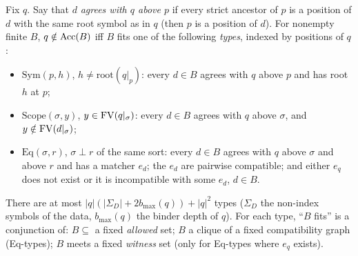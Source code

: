 \begin{lemma}\label{lem:many:types}
Fix $q$. Say that $d$ \emph{agrees with $q$ above $p$} if every strict ancestor of $p$ is a position of $d$ with the same
root symbol as in $q$ (then $p$ is a position of $d$). For nonempty finite $B$, $q\notin\mathrm{Acc}(B)$ iff $B$ fits one of the
following \emph{types}, indexed by positions of $q$:
\begin{itemize}
\item $\mathrm{Sym}(p,h)$, $h\neq\mathrm{root}(q|_p)$: every $d\in B$ agrees with $q$ above $p$ and has root $h$ at $p$;
\item $\mathrm{Scope}(\sigma,y)$, $y\in\mathrm{FV}(q|_\sigma)$: every $d\in B$ agrees with $q$ above $\sigma$, and
  $y\notin\mathrm{FV}(d|_\sigma)$;
\item $\mathrm{Eq}(\sigma,r)$, $\sigma\perp r$ of the same sort: every $d\in B$ agrees with $q$ above $\sigma$ and above $r$
  and has a matcher $e_d$; the $e_d$ are pairwise compatible; and either $e_q$ does not exist or it is incompatible with
  some $e_d$, $d\in B$.
\end{itemize}
There are at most $|q|(|\Sigma_D|+2b_{\max}(q))+|q|^2$ types ($\Sigma_D$ the non-index symbols of the data, $b_{\max}(q)$ the
binder depth of $q$). For each type, ``$B$ fits'' is a conjunction of: $B\subseteq$ a fixed \emph{allowed} set; $B$ a clique of
a fixed compatibility graph (Eq-types); $B$ meets a fixed \emph{witness} set (only for Eq-types where $e_q$ exists).
\end{lemma}

